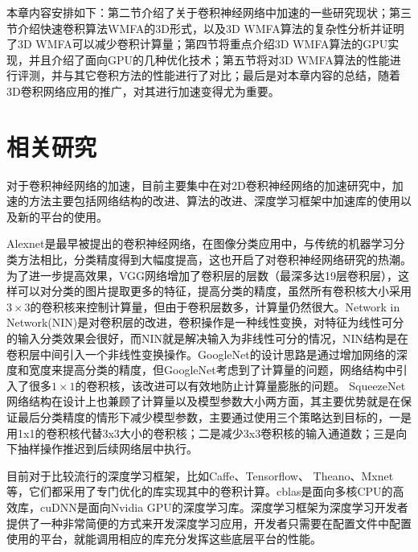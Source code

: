 本章内容安排如下：第二节介绍了关于卷积神经网络中加速的一些研究现状；第三节介绍快速卷积算法WMFA的3D形式，以及3D WMFA算法的复杂性分析并证明了3D WMFA可以减少卷积计算量；第四节将重点介绍3D WMFA算法的GPU实现，并且介绍了面向GPU的几种优化技术；第五节将对3D WMFA算法的性能进行评测，并与其它卷积方法的性能进行了对比；最后是对本章内容的总结，随着3D卷积网络应用的推广，对其进行加速变得尤为重要。

\section{相关研究}
对于卷积神经网络的加速，目前主要集中在对2D卷积神经网络的加速研究中，加速的方法主要包括网络结构的改进、算法的改进、深度学习框架中加速库的使用以及新的平台的使用。

Alexnet是最早被提出的卷积神经网络，在图像分类应用中，与传统的机器学习分类方法相比，分类精度得到大幅度提高，这也开启了对卷积神经网络研究的热潮。为了进一步提高效果，VGG网络增加了卷积层的层数（最深多达19层卷积层），这样可以对分类的图片提取更多的特征，提高分类的精度，虽然所有卷积核大小采用$3\times 3$的卷积核来控制计算量，但由于卷积层数多，计算量仍然很大。Network in Network(NIN)是对卷积层的改进，卷积操作是一种线性变换，对特征为线性可分的输入分类效果会很好，而NIN就是解决输入为非线性可分的情况，NIN结构是在卷积层中间引入一个非线性变换操作。GoogleNet的设计思路是通过增加网络的深度和宽度来提高分类的精度，但GoogleNet考虑到了计算量的问题，网络结构中引入了很多$1\times 1$的卷积核，该改进可以有效地防止计算量膨胀的问题。 SqueezeNet网络结构在设计上也兼顾了计算量以及模型参数大小两方面，其主要优势就是在保证最后分类精度的情形下减少模型参数，主要通过使用三个策略达到目标的，一是用1x1的卷积核代替3x3大小的卷积核；二是减少3x3卷积核的输入通道数；三是向下抽样操作推迟到后续网络层中执行。

目前对于比较流行的深度学习框架，比如Caffe、Tensorflow、
Theano、Mxnet等，它们都采用了专门优化的库实现其中的卷积计算。cblas是面向多核CPU的高效库，cuDNN是面向Nvidia GPU的深度学习库。深度学习框架为深度学习开发者提供了一种非常简便的方式来开发深度学习应用，开发者只需要在配置文件中配置使用的平台，就能调用相应的库充分发挥这些底层平台的性能。

